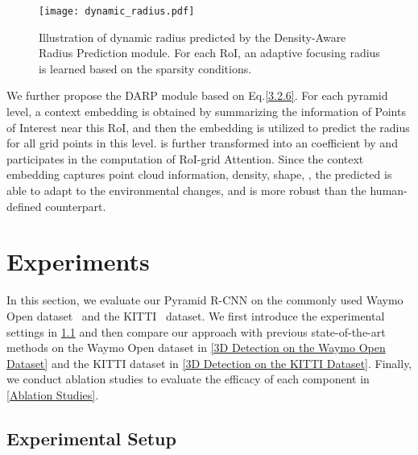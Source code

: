 \documentclass[10pt,twocolumn,letterpaper]{article}
\begin{document}
\begin{figure}[!t]
\centering
\texttt{[image: dynamic\_radius.pdf]}
\caption{Illustration of dynamic radius predicted by the Density-Aware Radius Prediction module. For each RoI, an adaptive focusing radius is learned based on the sparsity conditions.}
\label{fig_radius}
\vspace{-4mm}
\end{figure}

We further propose the DARP module based on Eq.\ref{3.2.6}. For each pyramid level, a context embedding is obtained by summarizing the information of Points of Interest near this RoI, and then the embedding is utilized to predict the radius  for all grid points in this level.  is further transformed into an coefficient by  and participates in the computation of RoI-grid Attention. Since the context embedding captures point cloud information, \ie density, shape, \etc, the predicted  is able to adapt to the environmental changes, and is more robust than the human-defined counterpart.

\section{Experiments}
In this section, we evaluate our Pyramid R-CNN on the commonly used Waymo Open dataset~\cite{sun2020scalability} and the KITTI~\cite{geiger2013vision} dataset. We first introduce the experimental settings in \ref{Experimental Setup} and then compare our approach with previous state-of-the-art methods on the Waymo Open dataset in \ref{3D Detection on the Waymo Open Dataset} and the KITTI dataset in \ref{3D Detection on the KITTI Dataset}. Finally, we conduct ablation studies to evaluate the efficacy of each component in \ref{Ablation Studies}.

\subsection{Experimental Setup} \label{Experimental Setup}
\end{document}
